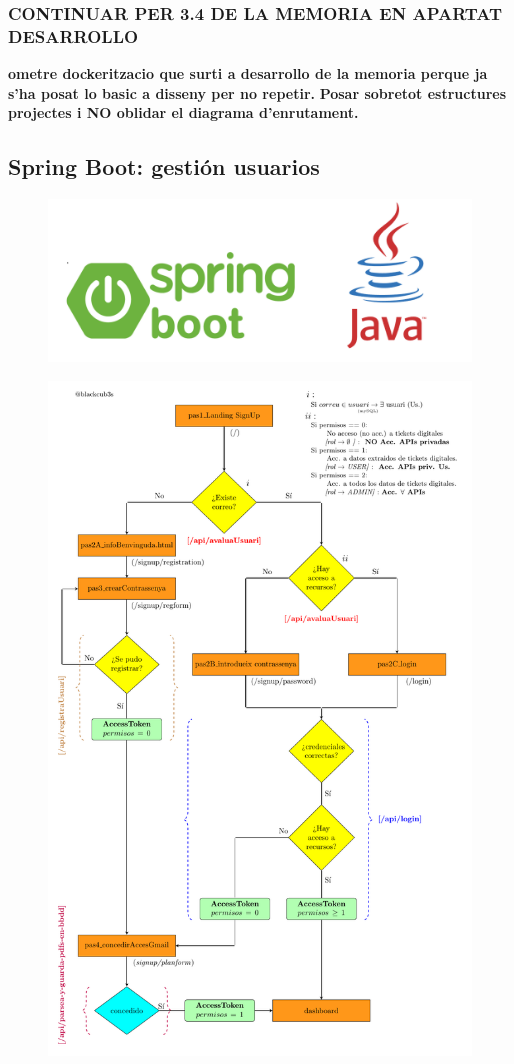 \documentclass{beamer}
\begin{document}
	
	
	
	\begin{frame}
		\frametitle{CONTINUAR PER 3.4 DE LA MEMORIA EN APARTAT DESARROLLO}
		\textbf{ometre dockeritzacio que surti a desarrollo de la memoria perque ja s'ha posat lo basic a disseny per no repetir.}
		\textbf{Posar sobretot estructures projectes i NO oblidar el diagrama d'enrutament.}
	\end{frame}
	
	
	
	
	\subsection{Spring Boot: gestión usuarios}
	
	
	
	\begin{frame}
		
		
		\begin{figure}
			\centering
			\includegraphics[width=1\linewidth]{imgEspecifiques/springBootLogoPART}
			
			\label{fig:springbootlogopart}
		\end{figure}
		
	\end{frame}
	
	
	\begin{frame}
		\begin{figure}
			\centering
			\includegraphics[width=.35\linewidth]{../img/diagramaMercAppFront}
			\label{fig:diagramatikzdefinitiuv2}
		\end{figure}
	\end{frame}
	
\end{document}
